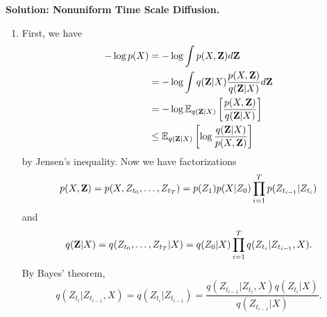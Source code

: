 \documentclass[12pt]{article}
\begin{document}
\begin{enumerate}
\begin{solution}{\bf Solution: Nonuniform Time Scale Diffusion.}
\begin{enumerate}
    Thus, 
    \[\begin{aligned}\mu_Q(Z_t,X;s,t)&=\alpha_sX+\frac{\alpha_{t|s}\sigma_s^2}{\sigma_t^2}(Z_t-\alpha_tX)\\&=\frac{\alpha_{t|s}\sigma_s^2}{\sigma_t^2}Z_t+\alpha_sX-\frac{\alpha_{t|s}\sigma_s^2}{\sigma_t^2}(\alpha_{t|s}\alpha_s)X\\&=\frac{\alpha_{t|s}\sigma_s^2}{\sigma_t^2}Z_t+\alpha_s\left(1-\frac{\alpha_{t|s}^2\sigma_s^2}{\sigma_t^2}\right)X\\&=\frac{\alpha_{t|s}\sigma_s^2}{\sigma_t^2}Z_t+\frac{\alpha_s\sigma_{t|s}^2}{\sigma_t^2}X,
    \end{aligned}
    \]
    and
    \[
    \sigma_Q^2(s,t)=\sigma_s^2-\frac{(\alpha_{t|s}\sigma_s^2)^2}{\sigma_t^2}=\frac{\sigma_s^2\sigma_{t|s}^2}{\sigma_t^2}.
    \]
    \item First, we have 
    \[\begin{aligned}
        -\log p(X)&=-\log\int p(X,{\bf Z})d{\bf Z}\\&=-\log\int q({\bf Z}|X)\frac{p(X,{\bf Z})}{q({\bf Z}|X)}d{\bf Z}\\&=-\log\mathbb{E}_{q({\bf Z}|X)}\left[\frac{p(X,{\bf Z})}{q({\bf Z}|X)}\right]\\&\leq\mathbb{E}_{q({\bf Z}|X)}\left[\log\frac{q({\bf Z}|X)}{p(X,{\bf Z})}\right]
    \end{aligned}\]
    by Jensen's inequality.
    Now we have factorizations
    \[p(X, {\bf Z}) =p(X,Z_{t_0},\dots, Z_{t_T})=p(Z_1) p(X|Z_0) \prod_{i=1}^{T} p(Z_{t_{i-1}}|Z_{t_i})
    \]
    and
    \[
    q({\bf Z}|X) = q(Z_{t_0}, \dots, Z_{t_T}|X) = q(Z_0|X) \prod_{i=1}^{T} q(Z_{t_i}|Z_{t_{i-1}},X).
    \]
    By Bayes' theorem, 
    \[q(Z_{t_i}|Z_{t_{i-1}},X)=q(Z_{t_i}|Z_{t_{i-1}})=\frac{q(Z_{t_{i-1}}|Z_{t_i},X)q(Z_{t_i}|X)}{q(Z_{t_{i-1}}|X)}.\]
    

\end{enumerate}
\end{solution}
\end{enumerate}
\end{document}
